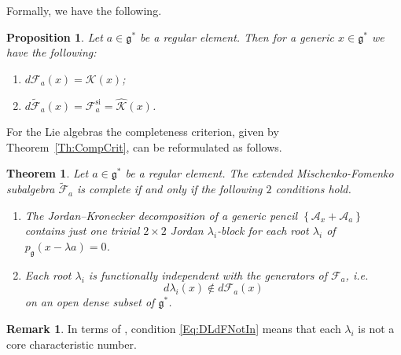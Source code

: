 \documentclass[12pt]{article}
\newtheorem{proposition}[lemma]{Proposition}
\newtheorem{theorem}[lemma]{Theorem}
\theoremstyle{definition}
\newtheorem{remark}[lemma]{Remark}
\begin{document}
Formally, we have the following.

\begin{proposition} Let $a \in \mathfrak{g}^*$ be a regular element. Then for a generic $x\in \mathfrak{g}^*$ we have the following:

\begin{enumerate}

\item  $d\mathcal{F}_a (x) = \mathcal{K} (x) $;

\item  $d\tilde{\mathcal{F}}_a (x) = \mathcal{F}_a^{\operatorname{si}} = \hat{\mathcal{K}} (x) $.

\end{enumerate}

\end{proposition}





For the Lie algebras the completeness criterion, given by Theorem~\ref{Th:CompCrit}, can be reformulated as follows.

\begin{theorem} \label{T:Jordan1Form} Let $a \in \mathfrak{g}^*$ be a regular element. The extended Mischenko-Fomenko subalgebra $\tilde{\mathcal{F}}_a$ is complete if and only if the following $2$ conditions hold. 

\begin{enumerate}

\item The Jordan--Kronecker decomposition of a generic pencil $\left\{\mathcal{A}_x + \mathcal{A}_a\right\}$ contains just one trivial $2 \times 2$ Jordan $\lambda_i$-block for each root $\lambda_i$ of $p_{\mathfrak{g}}(x - \lambda a) =0$.

\item \label{Item:Cond2Jord} Each root $\lambda_i$ is functionally independent with the generators of $\mathcal{F}_a$, i.e. \begin{equation} \label{Eq:DLdFNotIn} d \lambda_i(x) \not \in d \mathcal{F}_a(x)\end{equation} on an open dense subset of $\mathfrak{g}^*$.

\end{enumerate}

\end{theorem}

\begin{remark}
In terms of \cite{Kozlov23JKRealization}, condition \eqref{Eq:DLdFNotIn} means that each $\lambda_i$ is not a core characteristic number. \end{remark}
\end{document}
